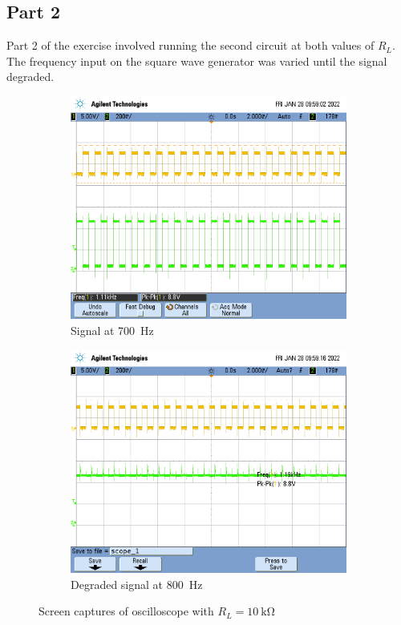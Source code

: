 \documentclass[CMPE]{../KGCOEReport}
\begin{document}
	\pagebreak

	\subsection*{Part 2}

	Part 2 of the exercise involved running the second circuit at both values of $R_L$.
	The frequency input on the square wave generator was varied until the signal
	degraded.

	\begin{figure}[ht]
	\begin{subfigure}{.5\textwidth}
	  \centering
	  \includegraphics[width=.8\linewidth]{p700_10k}
	  \caption{Signal at \SI{700}{\hertz}}
	  \label{fig:sub-first}
	\end{subfigure}
	\begin{subfigure}{.5\textwidth}
	  \centering
	  \includegraphics[width=.8\linewidth]{p800_10k}
	  \caption{Degraded signal at \SI{800}{\hertz}}
	  \label{fig:sub-second}
	\end{subfigure}
	\caption{Screen captures of oscilloscope with $R_L=\SI{10}{\kilo\ohm}$}
	\label{fig:p21}
	\end{figure}
\end{document}
